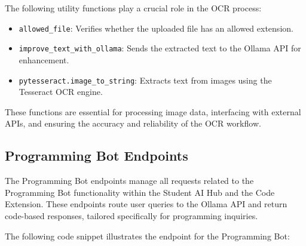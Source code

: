 The following utility functions play a crucial role in the OCR process:
\begin{itemize}
    \item \texttt{allowed\_file}: Verifies whether the uploaded file has an allowed extension.
    \item \texttt{improve\_text\_with\_ollama}: Sends the extracted text to the Ollama API for enhancement.
    \item \texttt{pytesseract.image\_to\_string}: Extracts text from images using the Tesseract OCR engine.
\end{itemize}

These functions are essential for processing image data, interfacing with external APIs, and ensuring the accuracy and reliability of the OCR workflow.

\subsection{Programming Bot Endpoints}

The Programming Bot endpoints manage all requests related to the Programming Bot functionality within the Student AI Hub and the Code Extension. These endpoints route user queries to the Ollama API and return code-based responses, tailored specifically for programming inquiries.

The following code snippet illustrates the endpoint for the Programming Bot:

